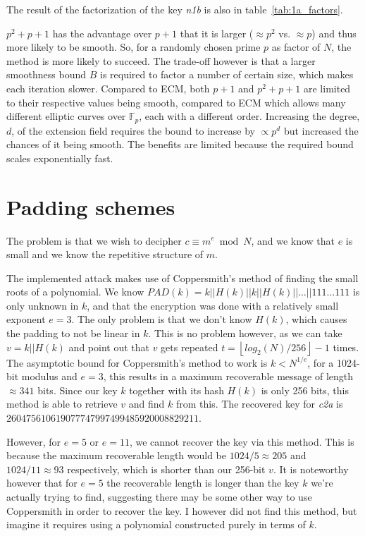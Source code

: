\documentclass{article}
\newcommand{\floor}[1]{\left\lfloor #1 \right\rfloor}
\begin{document}
The result of the factorization of the key \textit{n1b} is also in table~\ref{tab:1a_factors}.

$p^2+p+1$ has the advantage over $p+1$ that it is larger ($\approx p^2$ vs. $\approx p$) and thus more likely to be smooth. So, for a randomly chosen prime $p$ as factor of $N$, the method is more likely to succeed. The trade-off however is that a larger smoothness bound $B$ is required to factor a number of certain size, which makes each iteration slower. Compared to ECM, both $p+1$ and $p^2+p+1$ are limited to their respective values being smooth, compared to ECM which allows many different elliptic curves over $\mathbb{F}_p$, each with a different order. Increasing the degree, $d$, of the extension field requires the bound to increase by $\propto p^d$ but increased the chances of it being smooth. The benefits are limited because the required bound scales exponentially fast.

\section{Padding schemes}
The problem is that we wish to decipher $c \equiv m^e \bmod N$, and we know that $e$ is small and we know the repetitive structure of $m$.
 
The implemented attack makes use of Coppersmith's method of finding the small roots of a polynomial. We know $PAD(k) = k || H(k) || k || H(k) || \dots || 111 \dots 111$ is only unknown in $k$, and that the encryption was done with a relatively small exponent $e = 3$. The only problem is that we don't know $H(k)$, which causes the padding to not be linear in $k$. This is no problem however, as we can take $v = k || H(k)$ and point out that $v$ gets repeated $t = \floor{log_2(N)/256}-1$ times. The asymptotic bound for Coppersmith's method to work is $k < N^{1/e}$, for a 1024-bit modulus and $e=3$, this results in a maximum recoverable message of length $\approx 341$ bits. Since our key $k$ together with its hash $H(k)$ is only 256 bits, this method is able to retrieve $v$ and find $k$ from this. The recovered key for \textit{c2a} is $260475610619077747997499485920008829211$.

However, for $e = 5$ or $e = 11$, we cannot recover the key via this method. This is because the maximum recoverable length would be $1024/5 \approx 205$ and $1024/11 \approx 93$ respectively, which is shorter than our 256-bit $v$. It is noteworthy however that for $e=5$ the recoverable length is longer than the key $k$ we're actually trying to find, suggesting there may be some other way to use Coppersmith in order to recover the key. I however did not find this method, but imagine it requires using a polynomial constructed purely in terms of $k$.
\end{document}
